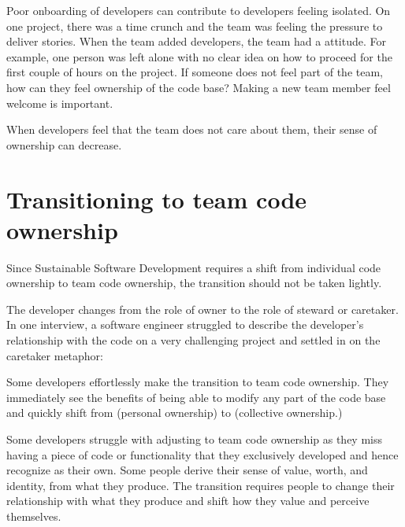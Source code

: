 Poor onboarding of developers can contribute to developers feeling isolated. On one project, there was a time crunch and the team was feeling the pressure to deliver stories. When the team added developers, the team had a  attitude. For example, one person was left alone with no clear idea on how to proceed for the first couple of hours on the project. If someone does not feel part of the team, how can they feel ownership of the code base? Making a new team member feel welcome is important.



When developers feel that the team does not care about them, their sense of ownership can decrease.
\section{Transitioning to team code ownership}
\label{Transitioning}
Since Sustainable Software Development requires a shift from individual code ownership to team code ownership, the transition should not be taken lightly. 


The developer changes from the role of owner to the role of steward or caretaker. In one interview, a software engineer struggled to describe the developer’s relationship with the code on a very challenging project and settled in on the caretaker metaphor: 

Some developers effortlessly make the transition to team code ownership. They immediately see the benefits of being able to modify any part of the code base and quickly shift from  (personal ownership) to  (collective ownership.)

Some developers struggle with adjusting to team code ownership as they miss having a piece of code or functionality that they exclusively developed and hence recognize as their own. Some people derive their sense of value, worth, and identity, from what they produce. The transition requires people to change their relationship with what they produce and shift how they value and perceive themselves. 

